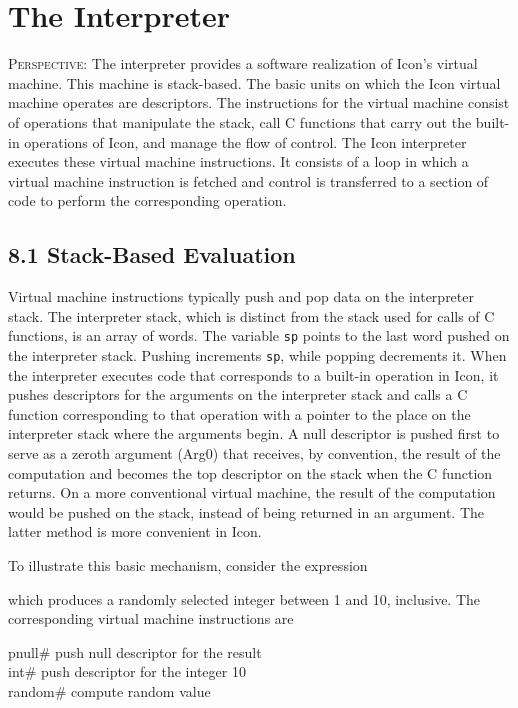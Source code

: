 \chapter{The Interpreter}

\textsc{Perspective}: The interpreter provides a software realization
of Icon's virtual machine. This machine is stack-based. The basic
units on which the Icon virtual machine operates are descriptors. The
instructions for the virtual machine consist of operations that
manipulate the stack, call C functions that carry out the built-in
operations of Icon, and manage the flow of control. The Icon
interpreter executes these virtual machine instructions.  It consists
of a loop in which a virtual machine instruction is fetched and
control is transferred to a section of code to perform the
corresponding operation.

\section[8.1 Stack-Based Evaluation]{8.1 Stack-Based Evaluation}

Virtual machine instructions typically push and pop data on the
interpreter stack. The interpreter stack, which is distinct from the
stack used for calls of C functions, is an array of words. The
variable \texttt{sp} points to the last word pushed on the interpreter
stack. Pushing increments \texttt{sp}, while popping decrements it. When the
interpreter executes code that corresponds to a built-in operation in
Icon, it pushes descriptors for the arguments on the interpreter stack
and calls a C function corresponding to that operation with a pointer
to the place on the interpreter stack where the arguments begin. A
null descriptor is pushed first to serve as a
{\textquotedbl}zeroth{\textquotedbl} argument (Arg0) that receives, by
convention, the result of the computation and becomes the top
descriptor on the stack when the C function returns. On a more
conventional virtual machine, the result of the computation would be
pushed on the stack, instead of being returned in an argument. The
latter method is more convenient in Icon.

To illustrate this basic mechanism, consider the expression


\noindent which produces a randomly selected integer between 1 and 10,
inclusive. The corresponding virtual machine instructions are

\begin{iconcode}
\>pnull\>\>\>\>\>\>\# push null descriptor for the result\\
\>int\>\>\>\>\>\# push descriptor for the integer 10\\
\>random\>\>\>\>\>\>\# compute random value
\end{iconcode}

